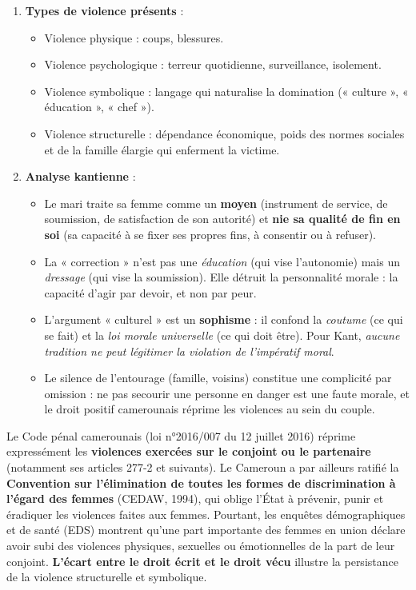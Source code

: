 \documentclass[11pt]{article}
\newcommand{\cle}[1]{{\popxbold\color{popdark}#1}}
\begin{document}
\begin{enumerate}
\item \textbf{Types de violence présents} :
\begin{itemize}
\item \cle{Violence physique} : coups, blessures.
\item \cle{Violence psychologique} : terreur quotidienne, surveillance, isolement.
\item \cle{Violence symbolique} : langage qui naturalise la domination (« culture », « éducation », « chef »).
\item \cle{Violence structurelle} : dépendance économique, poids des normes sociales et de la famille élargie qui enferment la victime.
\end{itemize}

\item \textbf{Analyse kantienne} :
\begin{itemize}
\item Le mari traite sa femme comme un \textbf{moyen} (instrument de service, de soumission, de satisfaction de son autorité) et \textbf{nie sa qualité de fin en soi} (sa capacité à se fixer ses propres fins, à consentir ou à refuser).
\item La « correction » n'est pas une \emph{éducation} (qui vise l'autonomie) mais un \emph{dressage} (qui vise la soumission). Elle détruit la \cle{personnalité morale} : la capacité d'agir par devoir, et non par peur.
\item L'argument « culturel » est un \textbf{sophisme} : il confond la \emph{coutume} (ce qui se fait) et la \emph{loi morale universelle} (ce qui doit être). Pour Kant, \emph{aucune tradition ne peut légitimer la violation de l'impératif moral}.
\item Le silence de l'entourage (famille, voisins) constitue une \cle{complicité par omission} : ne pas secourir une personne en danger est une faute morale, et le droit positif camerounais réprime les violences au sein du couple.
\end{itemize}
\end{enumerate}

\begin{savaistu}
Le Code pénal camerounais (loi n°2016/007 du 12 juillet 2016) réprime expressément les \textbf{violences exercées sur le conjoint ou le partenaire} (notamment ses articles 277-2 et suivants). Le Cameroun a par ailleurs ratifié la \textbf{Convention sur l'élimination de toutes les formes de discrimination à l'égard des femmes} (CEDAW, 1994), qui oblige l'État à prévenir, punir et éradiquer les violences faites aux femmes. Pourtant, les enquêtes démographiques et de santé (EDS) montrent qu'une part importante des femmes en union déclare avoir subi des violences physiques, sexuelles ou émotionnelles de la part de leur conjoint. \textbf{L'écart entre le droit écrit et le droit vécu} illustre la persistance de la violence structurelle et symbolique.
\end{savaistu}
\end{document}
